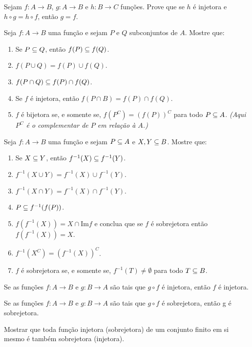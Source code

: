 \documentclass[12pt]{exam}
\begin{document}
\vspace{.3cm}

\questao{} Sejam $f : A \to B$, $g : A \to B$ e $h : B \to C$ fun\c{c}\~oes. Prove que se $h$ \'e injetora e $h \circ g = h \circ f$, ent\~ao $g = f$.

\vspace{.3cm}

\questao{} Seja $f : A \to B$ uma fun\c{c}\~ao e sejam $P$ e $Q$ subconjuntos de $A$. Mostre que:
\begin{enumerate}[label={\alph*})]
	\item Se $P\subseteq Q$, ent{\~a}o $f(P)\subseteq f(Q)$.
	\item $f(P\cup Q) = f(P)\cup f(Q)$.
	\item $f(P\cap Q)\subseteq f(P)\cap f(Q)$.
	\item Se $f$ {\'e} injetora, ent{\~a}o $f(P\cap B) =  f(P)\cap f(Q)$.
	\item $f$ {\'e} bijetora se, e somente se, $f(P^C) = (f(P))^C$ para todo $P \subseteq A$. \textit{(Aqui $P^C$ \'e o complementar de $P$ em rela\c{c}\~ao \`a $A$.)}
\end{enumerate}

\vspace{.3cm}

\questao{} Seja $f : A \to B$ uma fun{\c c}{\~a}o e sejam $P \subseteq
A$ e $X, Y\subseteq B$. Mostre que:
\begin{enumerate}[label={\alph*})]
	\item Se $X\subseteq Y$, ent{\~a}o $f^{-1}(X)\subseteq f^{-1}(Y)$.
	\item $f^{-1}(X\cup Y)=f^{-1}(X)\cup f^{-1}(Y)$.
	\item $f^{-1}(X\cap Y)= f^{-1}(X)\cap f^{-1}(Y)$.
	\item $P\subseteq f^{-1}(f(P))$.
	\item $f(f^{-1}(X))= X \cap \mbox{Im}f$ e conclua que se $f$ {\'e} sobrejetora ent{\~a}o
	$f(f^{-1}(X))=X$.
	\item $f^{-1}(X^C) = (f^{-1}(X))^C$.
	\item $f$ \'e sobrejetora se, e somente se, $f^{-1}(T) \ne \emptyset$ para todo $T \subseteq B$.
\end{enumerate}

\vspace{.3cm}

\questao{} Se as fun{\c c}{\~o}es $f : A \to B$ e $g : B\to A$ s{\~a}o
tais que $g\circ f$ {\'e} injetora, ent{\~a}o $f$ {\'e} injetora.

\vspace{.3cm}

\questao{} Se as fun{\c c}{\~o}es $f : A \to B$ e $g : B\to A$ s{\~a}o
tais que $g\circ f$ {\'e} sobrejetora, ent{\~a}o g {\'e} sobrejetora.

\vspace{.3cm}

\questao{} Mostrar que toda fun{\c c}{\~a}o injetora (sobrejetora) de um conjunto finito em si mesmo {\'e} tamb{\'e}m sobrejetora (injetora).
\end{document}
